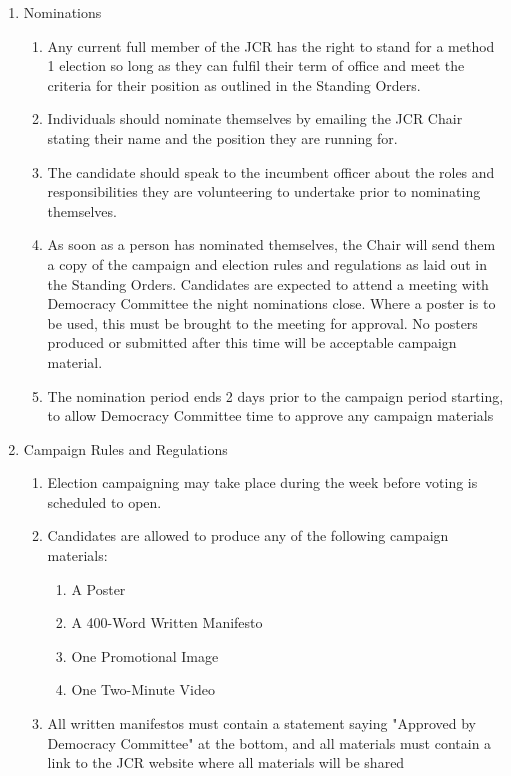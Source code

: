 \label{Method 1 Campaign Regulations}
\begin{enumerate}
    \item Nominations
    \begin{enumerate}
        \item Any current full member of the JCR has the right to stand for a method 1 election so long as they can fulfil their term of office and meet the criteria for their position as outlined in the Standing Orders.
        \item Individuals should nominate themselves by emailing the JCR Chair stating their name and the position they are running for.
        \item The candidate should speak to the incumbent officer about the roles and responsibilities they are volunteering to undertake prior to nominating themselves.
        \item As soon as a person has nominated themselves, the Chair will send them a copy of the campaign and election rules and regulations as laid out in the Standing Orders. Candidates are expected to attend a meeting with Democracy Committee the night nominations close. Where a poster is to be used, this must be brought to the meeting for approval. No posters produced or submitted after this time will be acceptable campaign material.
        \item The nomination period ends 2 days prior to the campaign period starting, to allow Democracy Committee time to approve any campaign materials 
    \end{enumerate}
    \item Campaign Rules and Regulations
    \label{it:rules}
    \begin{enumerate}
        \item Election campaigning may take place during the week before voting is scheduled to open.
        \item Candidates are allowed to produce any of the following campaign materials:
        \begin{enumerate}
            \item A Poster
            \item A 400-Word Written Manifesto
            \item One Promotional Image
            \item One Two-Minute Video 
        \end{enumerate}
        \item All written manifestos must contain a statement saying "Approved by Democracy Committee" at the bottom, and all materials must contain a link to the JCR website where all materials will be shared

\end{enumerate}
\end{enumerate}

